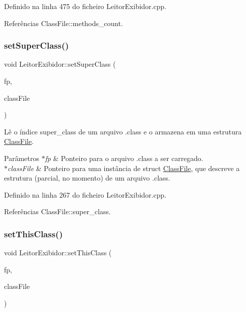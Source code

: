 Definido na linha 475 do ficheiro Leitor\+Exibidor.\+cpp.



Referências Class\+File\+::methods\+\_\+count.

\mbox{\label{classLeitorExibidor_af726ef535e88d9d86938a2d6aad6658c}} 
\subsubsection{\texorpdfstring{set\+Super\+Class()}{setSuperClass()}}
{\footnotesize\ttfamily void Leitor\+Exibidor\+::set\+Super\+Class (\begin{DoxyParamCaption}\item[{F\+I\+LE $\ast$}]{fp,  }\item[{\hyperlink{classClassFile}{Class\+File} $\ast$}]{class\+File }\end{DoxyParamCaption})\hspace{0.3cm}{\ttfamily [private]}}

Lê o índice super\+\_\+class de um arquivo .class e o armazena em uma estrutura \hyperlink{classClassFile}{Class\+File}. 
\begin{DoxyParams}{Parâmetros}
{\em $\ast$fp} & Ponteiro para o arquivo .class a ser carregado. \\
\hline
{\em $\ast$class\+File} & Ponteiro para uma instância de struct \hyperlink{classClassFile}{Class\+File}, que descreve a estrutura (parcial, no momento) de um arquivo .class. \\
\hline
\end{DoxyParams}


Definido na linha 267 do ficheiro Leitor\+Exibidor.\+cpp.



Referências Class\+File\+::super\+\_\+class.

\mbox{\label{classLeitorExibidor_af0f402911ed326bd9e495eef93a43c24}} 
\subsubsection{\texorpdfstring{set\+This\+Class()}{setThisClass()}}
{\footnotesize\ttfamily void Leitor\+Exibidor\+::set\+This\+Class (\begin{DoxyParamCaption}\item[{F\+I\+LE $\ast$}]{fp,  }\item[{\hyperlink{classClassFile}{Class\+File} $\ast$}]{class\+File }\end{DoxyParamCaption})\hspace{0.3cm}{\ttfamily [private]}}


